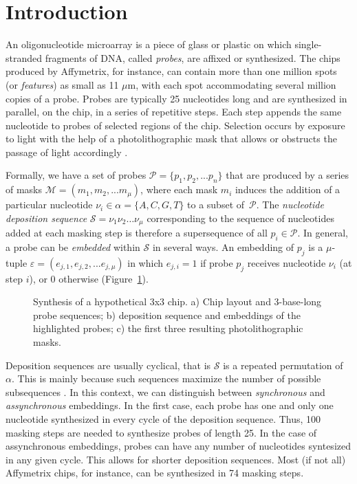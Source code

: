 \documentclass{bioinfo}
\begin{document}
\section{Introduction}

An oligonucleotide microarray is a piece of glass or plastic on which single-stranded fragments of DNA, called \emph{probes}, are affixed or synthesized. The chips produced by Affymetrix, for instance, can contain more than one million spots (or \emph{features}) as small as 11 $\mu$m, with each spot accommodating several million copies of a probe. Probes are typically 25 nucleotides long and are synthesized in parallel, on the chip, in a series of repetitive steps. Each step appends the same nucleotide to probes of selected regions of the chip. Selection occurs by exposure to light with the help of a photolithographic mask that allows or obstructs the passage of light accordingly \citep{FODOR91}.

Formally, we have a set of probes $\mathcal{P} = \{p_{1}, p_{2}, ... p_{n}\}$ that are produced by a series of masks $\mathcal{M} = (m_{1}, m_{2}, ... m_{\mu})$, where each mask $m_{i}$ induces the addition of a particular nucleotide $\nu_{i} \in \alpha = \{A, C, G, T\}$ to a subset of~$\mathcal{P}$. The \emph{nucleotide deposition sequence} $\mathcal{S} = \nu_{1} \nu_{2} \ldots \nu_{\mu}$ corresponding to the sequence of nucleotides added at each masking step is therefore a supersequence of all $p_{i} \in \mathcal{P}$. In general, a probe can be \emph{embedded} within $\mathcal{S}$ in several ways. An embedding of $p_{j}$ is a $\mu$-tuple $\varepsilon = (e_{j,1}, e_{j,2}, ... e_{j,\mu})$ in which $e_{j,i} = 1$ if probe $p_{j}$ receives nucleotide $\nu_{i}$ (at step $i$), or 0 otherwise (Figure~\ref{fig:masking_process}).

\begin{figure}
\caption{Synthesis of a hypothetical 3x3 chip. a) Chip layout and 3-base-long probe sequences; b) deposition sequence and embeddings of the highlighted probes; c) the first three resulting photolithographic masks.}
\label{fig:masking_process}
\end{figure}

Deposition sequences are usually cyclical, that is $\mathcal{S}$ is a repeated permutation of $\alpha$. This is mainly because such sequences maximize the number of possible subsequences \citep{CHASE76}. In this context, we can distinguish between \emph{synchronous} and \emph{assynchronous} embeddings. In the first case, each probe has one and only one nucleotide synthesized in every cycle of the deposition sequence. Thus, 100 masking steps are needed to synthesize probes of length 25. In the case of assynchronous embeddings, probes can have any number of nucleotides syntesized in any given cycle. This allows for shorter deposition sequences. Most (if not all) Affymetrix chips, for instance, can be synthesized in 74 masking steps.
\end{document}
